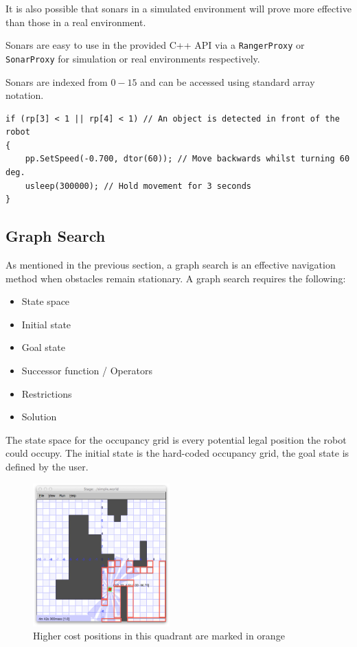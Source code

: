 \documentclass[a4paper,12pt]{article}
\begin{document}
It is also possible that sonars in a simulated environment will prove more effective than those in a real environment.

Sonars are easy to use in the provided C++ API via a \texttt{RangerProxy} or \texttt{SonarProxy} for simulation or real environments respectively. 

Sonars are indexed from $0-15$ and can be accessed using standard array notation.

\begin{lstlisting}
if (rp[3] < 1 || rp[4] < 1) // An object is detected in front of the robot
{
    pp.SetSpeed(-0.700, dtor(60)); // Move backwards whilst turning 60 deg.
    usleep(300000); // Hold movement for 3 seconds
} 
\end{lstlisting}
\subsection{Graph Search}
As mentioned in the previous section, a graph search is an effective navigation method when obstacles remain stationary. A graph search requires the following:
\begin{itemize}
    \item{State space}
    \item{Initial state}
    \item{Goal state}
    \item{Successor function / Operators}
    \item{Restrictions}
    \item{Solution}
\end{itemize}

The state space for the occupancy grid is every potential legal position the robot could occupy. The initial state is the hard-coded occupancy grid, the goal state is defined by the user.
\begin{figure}
    \begin{center}
            \includegraphics[width=0.47\textwidth]{images/Path_Cost_Grid.png}
            \caption{Higher cost positions in this quadrant are marked in orange}
    \end{center}
\end{figure}
\end{document}
